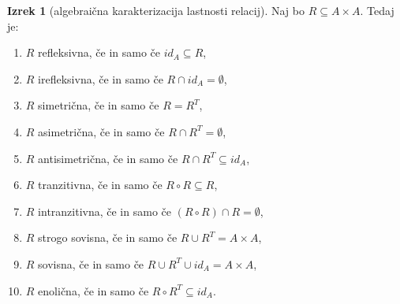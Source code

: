 \documentclass[11pt]{book}
\theoremstyle{definition}
\theoremstyle{zgled}
\theoremstyle{odprtproblem}
\theoremstyle{domacanaloga}
\theoremstyle{izrek}
\newtheorem*{izrek}{Izrek}
\begin{document}
\begin{izrek}[algebraična karakterizacija lastnosti relacij]
Naj bo $R \subseteq A \times A$. Tedaj je:
\begin{enumerate}
    \item $R$ refleksivna, če in samo če $id_A \subseteq R$,
    \item $R$ irefleksivna, če in samo če $R \cap id_A = \emptyset$,
    \item $R$ simetrična, če in samo če $R = R^T$,
    \item $R$ asimetrična, če in samo če $R \cap R^T = \emptyset$,
    \item $R$ antisimetrična, če in samo če $R \cap R^T \subseteq id_A$,
    \item $R$ tranzitivna, če in samo če $R \circ R \subseteq R$,
    \item $R$ intranzitivna, če in samo če $(R \circ R) \cap R = \emptyset$,
    \item $R$ strogo sovisna, če in samo če $R \cup R^T = A \times A$,
    \item $R$ sovisna, če in samo če $R \cup R^T \cup id_A = A \times A$,
    \item $R$ enolična, če in samo če $R \circ R^T \subseteq id_A$.
\end{enumerate}
\end{izrek}
\end{document}
